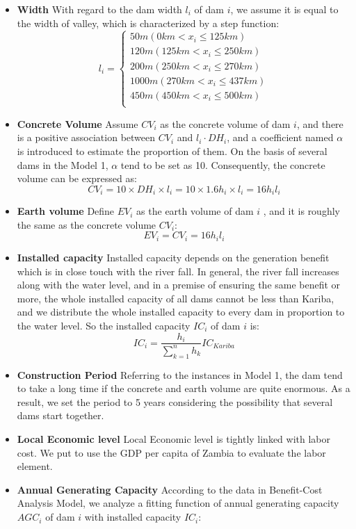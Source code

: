 \documentclass[12pt]{article}%
\begin{document}
\begin{enumerate}[1.]
\begin{itemize}
	\item{\textbf{Width}} With regard to the dam width $l_{i}$ of dam $i$, we assume it is equal to the width of valley, which is characterized by a step function:
	$$l_{i}=\begin{cases}
	50m(0km< x_{i} \leq 125km)\\
	120m(125km< x_{i} \leq 250km)\\
	200m(250km< x_{i} \leq 270km)\\
	1000m(270km< x_{i} \leq 437km)\\
	450m(450km< x_{i} \leq 500km)\\
	\end{cases}$$
	\item{\textbf{Concrete Volume}} Assume $CV_{i}$ as the concrete volume of dam  $i$, and there is a positive association between $CV_{i}$ and $l_{i}\cdot DH_{i}$, and a coefficient named $\alpha$ is introduced to estimate the proportion of them. On the basis of several dams in the Model 1, $\alpha$ tend to be set as 10. Consequently, the concrete volume can be expressed as:
 $$CV_{i}=10\times DH_{i}\times l_{i}=10\times 1.6h_{i} \times l_{i}=16h_{i}l_{i}$$
	\item{\textbf{Earth volume}}
Define $EV_{i}$ as the earth volume of dam $i$ , and it is roughly the same as the concrete volume $CV_{i}$:
 $$EV_{i}=CV_{i}=16h_{i}l_{i}$$
	\item{\textbf{Installed capacity}} Installed capacity depends on the generation benefit which is in close touch with the river fall. In general, the river fall increases along with the water level, and in a premise of ensuring the same benefit or more, the whole installed capacity of all dams cannot be less than Kariba, and we distribute the whole installed capacity to every dam in proportion to the water level. So the installed capacity $IC_{i}$ of dam $i$ is:
$$IC_{i}=\frac{h_{i}}{\sum_{k=1}^{n}h_{k}}IC_{Kariba}$$
	\item{\textbf{Construction Period}} Referring to the instances in Model 1, the dam tend to take a long time if the concrete and earth volume are quite enormous. As a result, we set the period to 5 years considering the possibility that several dams start together.
	\item{\textbf{Local Economic level}}
	Local Economic level is tightly linked with labor cost. We put to use the GDP per capita of Zambia to evaluate the labor element.
	\item{\textbf{Annual Generating Capacity}} According to the data in Benefit-Cost Analysis Model, we analyze a fitting function of annual generating capacity $AGC_{i}$ of dam $i$ with installed capacity $IC_{i}$:

\end{itemize}
\end{enumerate}
\end{document}
